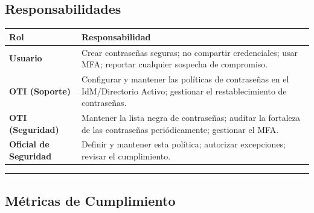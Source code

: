 \documentclass[10pt,letterpaper]{article}
\begin{document}
\subsection{Responsabilidades}\label{responsabilidades}

{\setlength{\RaggedRightRightskip}{0pt plus 5em}\small\sloppy \begin{longtable}[]{@{}
  >{\hspace{0pt}\RaggedRight\arraybackslash}p{}
  >{\hspace{0pt}\RaggedRight\arraybackslash}p{}@{}}
\toprule\noalign{}
\begin{minipage}[b]{\linewidth}\raggedright
Rol
\end{minipage} & \begin{minipage}[b]{\linewidth}\raggedright
Responsabilidad
\end{minipage} \\
\midrule\noalign{}
\endhead
\bottomrule\noalign{}
\endlastfoot
\textbf{Usuario} & Crear contraseñas seguras; no compartir credenciales;
usar MFA; reportar cualquier sospecha de compromiso. \\
\textbf{OTI (Soporte)} & Configurar y mantener las políticas de
contraseñas en el IdM/Directorio Activo; gestionar el restablecimiento
de contraseñas. \\
\textbf{OTI (Seguridad)} & Mantener la lista negra de contraseñas;
auditar la fortaleza de las contraseñas periódicamente; gestionar el
MFA. \\
\textbf{Oficial de Seguridad} & Definir y mantener esta política;
autorizar excepciones; revisar el cumplimiento. \\
\end{longtable}\normalsize}

\begin{center}\rule{0.5\linewidth}{0.5pt}\end{center}

\subsection{Métricas de Cumplimiento}\label{muxe9tricas-de-cumplimiento}
\end{document}
